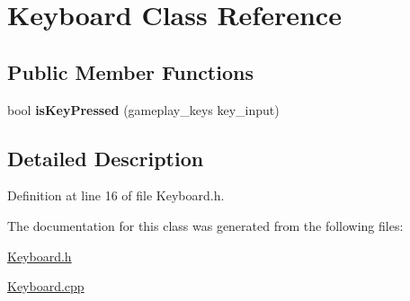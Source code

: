 \hypertarget{class_keyboard}{\section{Keyboard Class Reference}
\label{class_keyboard}
}
\subsection*{Public Member Functions}
\begin{DoxyCompactItemize}
\item 
\hypertarget{class_keyboard_af9ce238e3d65f0beeae81ff6224b164d}{bool {\bfseries is\+Key\+Pressed} (gameplay\+\_\+keys key\+\_\+input)}\label{class_keyboard_af9ce238e3d65f0beeae81ff6224b164d}

\end{DoxyCompactItemize}


\subsection{Detailed Description}


Definition at line 16 of file Keyboard.\+h.



The documentation for this class was generated from the following files\+:\begin{DoxyCompactItemize}
\item 
\hyperlink{_keyboard_8h}{Keyboard.\+h}\item 
\hyperlink{_keyboard_8cpp}{Keyboard.\+cpp}\end{DoxyCompactItemize}
